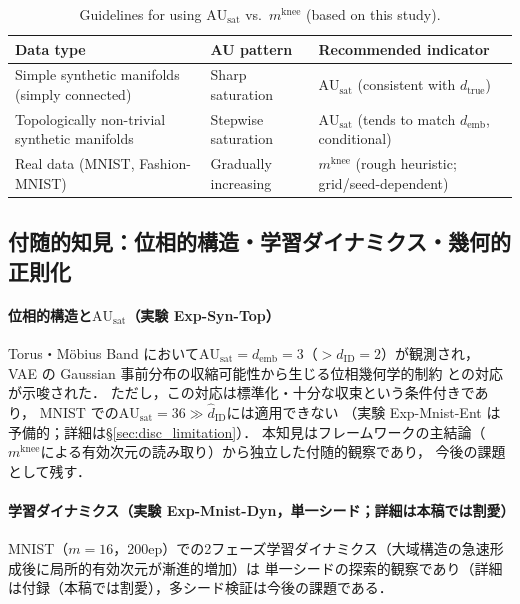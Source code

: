 \documentclass[11pt,a4paper]{jsarticle}
\newcommand{\dID}{d_{\mathrm{ID}}}
\newcommand{\dtrue}{d_{\mathrm{true}}}
\newcommand{\AUsat}{\mathrm{AU}_{\mathrm{sat}}}
\newcommand{\mknee}{m^{\mathrm{knee}}}
\newcommand{\demb}{d_{\mathrm{emb}}}
\begin{document}
\begin{table}[H]
\centering
\caption{Guidelines for using $\AUsat$ vs.\ $\mknee$ (based on this study).}
\label{tab:au_comparison}
\small
\begin{tabular}{lll}
\toprule
Data type & AU pattern & Recommended indicator \\
\midrule
Simple synthetic manifolds (simply connected) & Sharp saturation & $\AUsat$ (consistent with $\dtrue$) \\
Topologically non-trivial synthetic manifolds & Stepwise saturation & $\AUsat$ (tends to match $\demb$, conditional) \\
Real data (MNIST, Fashion-MNIST) & Gradually increasing & $\mknee$ (rough heuristic; grid/seed-dependent) \\
\bottomrule
\end{tabular}
\end{table}

\subsection{付随的知見：位相的構造・学習ダイナミクス・幾何的正則化}\label{sec:disc_incidental}

\paragraph{位相的構造と$\AUsat$（実験 Exp-Syn-Top）}
Torus・Möbius Band において$\AUsat = \demb = 3$（$> \dID = 2$）が観測され，
VAE の Gaussian 事前分布の収縮可能性から生じる位相幾何学的制約
\cite{hatcher2002algebraic,guillemin1974differential}との対応が示唆された．
ただし，この対応は標準化・十分な収束という条件付きであり，
MNIST での$\AUsat = 36 \gg \hat{d}_\mathrm{ID}$には適用できない
（実験 Exp-Mnist-Ent は予備的；詳細は§\ref{sec:disc_limitation}）．
本知見はフレームワークの主結論（$\mknee$による有効次元の読み取り）から独立した付随的観察であり，
今後の課題として残す．

\paragraph{学習ダイナミクス（実験 Exp-Mnist-Dyn，単一シード；詳細は本稿では割愛）}
MNIST（$m=16$，200ep）での2フェーズ学習ダイナミクス（大域構造の急速形成後に局所的有効次元が漸進的増加）は
単一シードの探索的観察であり（詳細は付録（本稿では割愛），多シード検証は今後の課題である．
\end{document}
